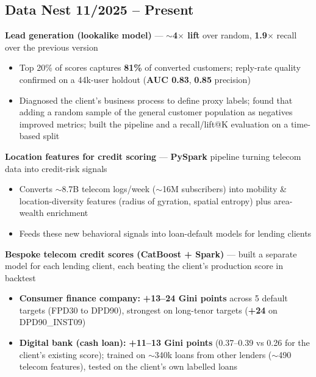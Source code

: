 \subsection{Data Nest \hfill 11/2025 -- Present}
\begin{zitemize}
    \item \textbf{Lead generation (lookalike model)} --- \textbf{$\sim$4$\times$ lift} over random, \textbf{1.9$\times$} recall over the previous version
    \begin{itemize}
        \item Top 20\% of scores captures \textbf{81\%} of converted customers; reply-rate quality confirmed on a 44k-user holdout (\textbf{AUC 0.83}, \textbf{0.85} precision)
        \item Diagnosed the client's business process to define proxy labels; found that adding a random sample of the general customer population as negatives improved metrics; built the pipeline and a recall/lift@K evaluation on a time-based split
    \end{itemize}
    \item \textbf{Location features for credit scoring} --- \textbf{PySpark} pipeline turning telecom data into credit-risk signals
    \begin{itemize}
        \item Converts $\sim$8.7B telecom logs/week ($\sim$16M subscribers) into mobility \& location-diversity features (radius of gyration, spatial entropy) plus area-wealth enrichment
        \item Feeds these new behavioral signals into loan-default models for lending clients
    \end{itemize}
    \item \textbf{Bespoke telecom credit scores (CatBoost + Spark)} --- built a separate model for each lending client, each beating the client's production score in backtest
    \begin{itemize}
        \item \textbf{Consumer finance company:} \textbf{+13--24 Gini points} across 5 default targets (FPD30 to DPD90), strongest on long-tenor targets (\textbf{+24} on DPD90\_INST09)
        \item \textbf{Digital bank (cash loan):} \textbf{+11--13 Gini points} (0.37--0.39 vs 0.26 for the client's existing score); trained on $\sim$340k loans from other lenders ($\sim$490 telecom features), tested on the client's own labelled loans

\end{itemize}
\end{zitemize}
